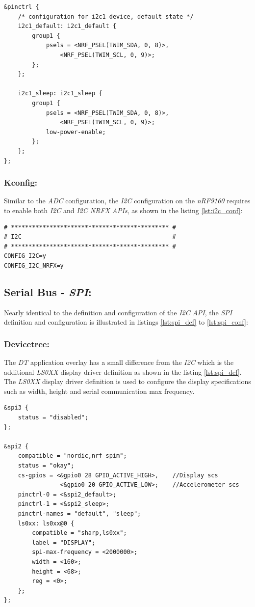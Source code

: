 \documentclass[report.tex]{subfiles}
\begin{document}
\begin{lstlisting}[style=C,label={lst:i2c_pinctrl},caption={\textit{DT I2C} Pinctrl Description}]
&pinctrl {
    /* configuration for i2c1 device, default state */
	i2c1_default: i2c1_default {
		group1 {
			psels = <NRF_PSEL(TWIM_SDA, 0, 8)>,
				<NRF_PSEL(TWIM_SCL, 0, 9)>;
		};
	};

	i2c1_sleep: i2c1_sleep {
		group1 {
			psels = <NRF_PSEL(TWIM_SDA, 0, 8)>,
				<NRF_PSEL(TWIM_SCL, 0, 9)>;
			low-power-enable;
		};
	};
};
\end{lstlisting}

\subsubsection{Kconfig:}
Similar to the \textit{ADC} configuration, the \textit{I2C} configuration on the \textit{nRF9160} requires to enable both \textit{I2C} and \textit{I2C NRFX} \textit{APIs}, as shown in the listing \ref{lst:i2c_conf}:
\begin{lstlisting}[style=console,label={lst:i2c_conf},caption={Application \textit{I2C} Configuration}]
# ********************************************* #
# I2C                                           #
# ********************************************* #
CONFIG_I2C=y
CONFIG_I2C_NRFX=y
\end{lstlisting}

\subsection{Serial Bus - \textit{SPI}:}
Nearly identical to the definition and configuration of the \textit{I2C} \textit{API}, the \textit{SPI} definition and configuration is illustrated in listings \ref{lst:spi_def} to \ref{lst:spi_conf}:
\subsubsection{Devicetree:}
The \textit{DT} application overlay has a small difference from the \textit{I2C} which is the additional \textit{LS0XX} display driver definition as shown in the listing \ref{lst:spi_def}. The \textit{LS0XX} display driver definition is used to configure the display specifications such as width, height and serial communication max frequency.

\begin{lstlisting}[style=C,label={lst:spi_def},caption={\textit{DT SPI} Description}]
&spi3 {
    status = "disabled";
};

&spi2 {
	compatible = "nordic,nrf-spim";
	status = "okay";
    cs-gpios = <&gpio0 28 GPIO_ACTIVE_HIGH>, 	//Display scs
				<&gpio0 20 GPIO_ACTIVE_LOW>;	//Accelerometer scs
	pinctrl-0 = <&spi2_default>;
	pinctrl-1 = <&spi2_sleep>;
	pinctrl-names = "default", "sleep";
	ls0xx: ls0xx@0 {
		compatible = "sharp,ls0xx";
		label = "DISPLAY";
		spi-max-frequency = <2000000>;
		width = <160>;
		height = <68>;
		reg = <0>;
	};
};
\end{lstlisting}
\end{document}

